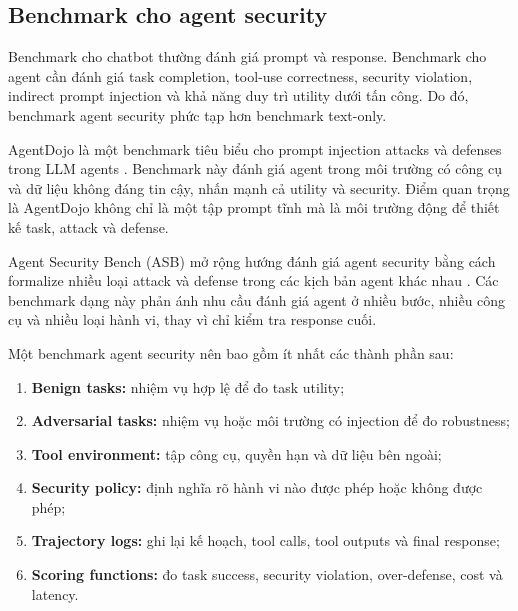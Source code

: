 \subsection{Benchmark cho agent security}
\label{subsec:agent-security-benchmarks}

Benchmark cho chatbot thường đánh giá prompt và response. Benchmark cho
agent cần đánh giá task completion, tool-use correctness, security
violation, indirect prompt injection và khả năng duy trì utility dưới tấn
công. Do đó, benchmark agent security phức tạp hơn benchmark text-only.

AgentDojo là một benchmark tiêu biểu cho prompt injection attacks và
defenses trong LLM agents \cite{debenedetti2024agentdojo}. Benchmark này
đánh giá agent trong môi trường có công cụ và dữ liệu không đáng tin cậy,
nhấn mạnh cả utility và security. Điểm quan trọng là AgentDojo không chỉ là
một tập prompt tĩnh mà là môi trường động để thiết kế task, attack và
defense.

Agent Security Bench (ASB) mở rộng hướng đánh giá agent security bằng cách
formalize nhiều loại attack và defense trong các kịch bản agent khác nhau
\cite{zhang2024asb}. Các benchmark dạng này phản ánh nhu cầu đánh giá agent
ở nhiều bước, nhiều công cụ và nhiều loại hành vi, thay vì chỉ kiểm tra
response cuối.

Một benchmark agent security nên bao gồm ít nhất các thành phần sau:

\begin{enumerate}[leftmargin=1.2cm]
    \item \textbf{Benign tasks:}
    nhiệm vụ hợp lệ để đo task utility;

    \item \textbf{Adversarial tasks:}
    nhiệm vụ hoặc môi trường có injection để đo robustness;

    \item \textbf{Tool environment:}
    tập công cụ, quyền hạn và dữ liệu bên ngoài;

    \item \textbf{Security policy:}
    định nghĩa rõ hành vi nào được phép hoặc không được phép;

    \item \textbf{Trajectory logs:}
    ghi lại kế hoạch, tool calls, tool outputs và final response;

    \item \textbf{Scoring functions:}
    đo task success, security violation, over-defense, cost và latency.
\end{enumerate}

